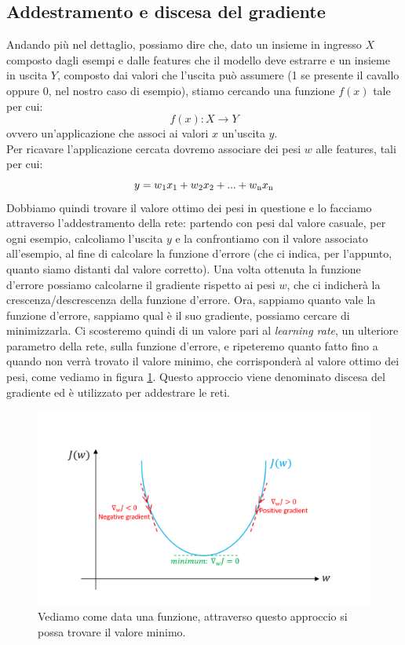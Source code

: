 \subsection{Addestramento e discesa del gradiente}
Andando più nel dettaglio, possiamo dire che, dato un insieme in ingresso $X$ composto dagli esempi e dalle features che il modello deve estrarre e un insieme in uscita $Y$, composto dai valori che l'uscita può assumere (1 se presente il cavallo oppure 0, nel nostro caso di esempio), stiamo cercando una funzione $f(x)$ tale per cui: $$f(x): X \rightarrow Y$$
ovvero un'applicazione che associ ai valori $x$ un'uscita $y$.
\\Per ricavare l'applicazione cercata dovremo associare dei pesi $w$ alle features, tali per cui: $$y = w\textsubscript{1}x\textsubscript{1} + w\textsubscript{2}x\textsubscript{2} + ... +
w\textsubscript{n}x\textsubscript{n}$$ 
Dobbiamo quindi trovare il valore ottimo dei pesi in questione e lo facciamo attraverso l'addestramento della rete: partendo con pesi dal valore casuale, per ogni esempio, calcoliamo l'uscita $y$ e la confrontiamo con il valore associato all'esempio, al fine di calcolare la funzione d'errore (che ci indica, per l'appunto, quanto siamo distanti dal valore corretto). Una volta ottenuta la funzione d'errore possiamo calcolarne il gradiente rispetto ai pesi $w$, che ci indicherà la crescenza/descrescenza della funzione d'errore. Ora, sappiamo quanto vale la funzione d'errore, sappiamo qual è il suo gradiente, possiamo cercare di minimizzarla. Ci scosteremo quindi di un valore pari al \emph{learning rate}, un ulteriore parametro della rete, sulla funzione d'errore, e ripeteremo quanto fatto fino a quando non verrà trovato il valore minimo, che corrisponderà al valore ottimo dei pesi, come vediamo in figura \ref{fig:Discesa del gradiente}. Questo approccio viene denominato discesa del gradiente ed è utilizzato per addestrare le reti.
\begin{figure}[H]
  \begin{center}
    \includegraphics[width=0.8\columnwidth]{images/gradiente.png}
  \end{center}
  \caption{Vediamo come data una funzione, attraverso questo approccio si possa trovare il valore minimo.}
  \label{fig:Discesa del gradiente}
\end{figure}


